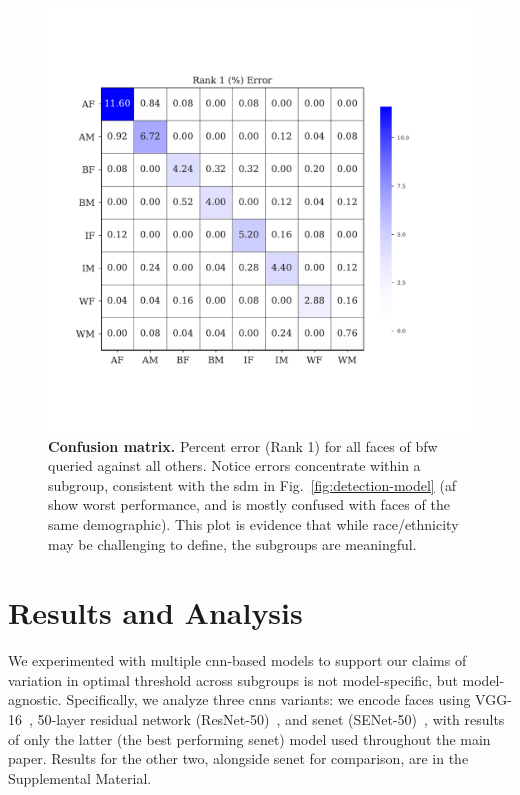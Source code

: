\begin{figure}[t!]
	\centering    
	\includegraphics[trim=.6in 1.4in 2.1in 1.65in,clip,width=.8\linewidth]{images/confusion.pdf}
		\caption{\small{\textbf{Confusion matrix.} Percent error (Rank 1) for all faces of \gls{bfw} queried against all others. Notice errors concentrate within a subgroup, consistent with the \gls{sdm} in Fig.~\ref{fig:detection-model} (\ie \gls{af} show worst performance, and is mostly confused with faces of the same demographic). This plot is evidence that while race/ethnicity may be challenging to define, the subgroups are meaningful.}}
		\label{fig:confusion} 
\end{figure} 

\section{Results and Analysis}

We experimented with multiple \gls{cnn}-based models to support our claims of variation in optimal threshold across subgroups is not model-specific, but model-agnostic. Specifically, we analyze three \glspl{cnn} variants: we encode faces using VGG-16~\cite{simonyan2014very},  50-layer residual network (\ie ResNet-50)~\cite{he2016deep}, and \gls{senet} (\ie SENet-50)~\cite{hu2018squeeze}, with results of only the latter (\ie the best performing \gls{senet}) model used throughout the main paper. Results for the other two, alongside \gls{senet} for comparison, are in the Supplemental Material.

